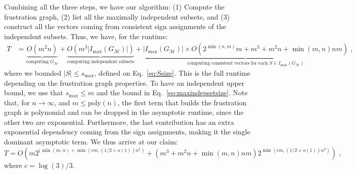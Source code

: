 \documentclass[10pt,aps,pra,twocolumn,floatfix,nofootinbib,superscriptaddress,longbibliography]{revtex4-2}
\newcommand{\1}{\mathbbm{1}}
\begin{document}
Combining all the three steps, we have our algorithm: (1) Compute the frustration graph, (2) list all the maximally independent subsets, and (3) construct all the vectors coming from consistent sign assignments of the independent subsets. Thus, we have, for the runtime:
\begin{align}
    T &= \underbrace{O(m^2 n)}_{\mathrm{computing\;} G_\mathcal M} + \underbrace{O(m^3|I_\mathrm{max}(G_\mathcal M)|)}_{\mathrm{computing\;independent\;subsets}} + \underbrace{|I_\mathrm{max}(G_\mathcal M)| \times O(2^{\min(n, m)}m + m^3+m^2n + \min(m,n)nm)}_{\mathrm{computing\;consistent\;{vectors\;for\;each\;} } S \in I_\mathrm{max}(G_\mathcal M)  }\;,
\end{align}
where we bounded $|S| \leq s_\mathrm{max}$, defined on Eq.~\eqref{eq:Ssize}. This is the full runtime depending on the frustration graph properties. To have an independent upper bound, we use that $s_\mathrm{max} \leq m$ and the bound in Eq.~\eqref{eq:maxindepsetsize}. Note that, for $n \to \infty$, and $m \leq \mathrm{poly}(n)$, the first term that builds the frustration graph is polynomial and can be dropped in the asymptotic runtime, since the other two are exponential. Furthermore, the last contribution has an extra exponential dependency coming from the sign assignments, making it the single dominant asymptotic term. We thus arrive at our claim:
\begin{equation}
    T = O(m2^{(\min(m,n) + \min(cm,(1/2+o(1))n^2)}+(m^3+m^2n+\min(m,n)nm)2^{\min(cm,(1/2+o(1))n^2)})\;,
\end{equation}
where $c=\log(3)/3$.
\end{document}
